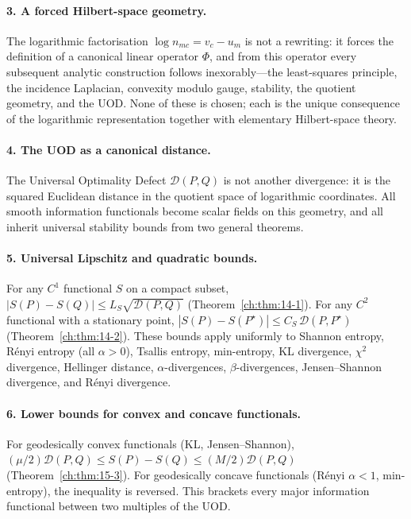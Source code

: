 \paragraph{3. A forced Hilbert-space geometry.}
The logarithmic factorisation $\log n_{mc}=v_c-u_m$ is not a rewriting:
it forces the definition of a canonical linear operator $\Phi$, and
from this operator every subsequent analytic construction follows
inexorably---the least-squares principle, the incidence Laplacian,
convexity modulo gauge, stability, the quotient geometry, and the UOD.
None of these is chosen; each is the unique consequence of the
logarithmic representation together with elementary Hilbert-space
theory.

\paragraph{4. The UOD as a canonical distance.}
The Universal Optimality Defect $\mathcal D(P,Q)$ is not another
divergence: it is the squared Euclidean distance in the quotient space
of logarithmic coordinates.  All smooth information functionals become
scalar fields on this geometry, and all inherit universal stability
bounds from two general theorems.

\paragraph{5. Universal Lipschitz and quadratic bounds.}
For any $C^1$ functional $S$ on a compact subset,
$|S(P)-S(Q)|\le L_S\sqrt{\mathcal D(P,Q)}$ (Theorem~\ref{ch:thm:14-1}).  For any
$C^2$ functional with a stationary point,
$|S(P)-S(P^\star)|\le C_S\,\mathcal D(P,P^\star)$ (Theorem~\ref{ch:thm:14-2}).
These bounds apply uniformly to Shannon entropy, R\'enyi entropy (all
$\alpha>0$), Tsallis entropy, min-entropy, KL divergence, $\chi^2$
divergence, Hellinger distance, $\alpha$-divergences, $\beta$-divergences,
Jensen--Shannon divergence, and R\'enyi divergence.

\paragraph{6. Lower bounds for convex and concave functionals.}
For geodesically convex functionals (KL, Jensen--Shannon),
$(\mu/2)\mathcal D(P,Q)\le S(P)-S(Q)\le (M/2)\mathcal D(P,Q)$
(Theorem~\ref{ch:thm:15-3}).  For geodesically concave functionals (R\'enyi
$\alpha<1$, min-entropy), the inequality is reversed.  This brackets
every major information functional between two multiples of the UOD.

